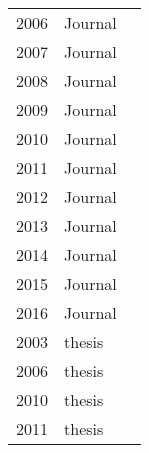 \begin{table}[]
\begin{tabular}{lll}
2006 & Journal & \cite{Garousi2006}\cite{Ag2006} \\
2007 & Journal & \cite{Cai2007}\cite{Nevedrov2007} \\
2008 & Journal & \cite{Bayan2008}\cite{Afzal2008}\cite{Bertolino2008} \\
2009 & Journal & \cite{Acharya2009}\cite{Jiang2009a}\cite{Afzal2009a}\cite{Hierons2009} \\
2010 & Journal & \cite{Wang2010}\cite{Malik2010b} \cite{Garousi2010} \\
2011 & Journal & \cite{Babbar2011}\cite{Barna2013}\cite{Nguyen2011}\cite{Shoaib2011}\cite{Zhang2011}\cite{Santos2011}\cite{Catelani2011} \\
2012 & Journal & \cite{Yan2012}\cite{Grechanik2012} \cite{Vasar2012} \\
2013 & Journal & \cite{Malik2013a}\cite{Wang2013}\cite{Wert2013a} \\
2014 & Journal & \cite{Wert2014}\cite{Wang2010} \\
2015 & Journal & \cite{Jiang2015}\cite{Luo2015}\cite{Harman2015} \\
2016 & Journal & \cite{Vogele2016} \\
2003 & thesis & \cite{Shousha2003} \\
2006 & thesis & \cite{Garousi2006} \\
2010 & thesis & \cite{Jiang2010} \\
2011 & thesis & \cite{Vetoio2011}
\end{tabular}
\end{table}


